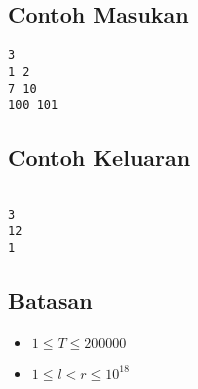 \documentclass{article}
\begin{document}
\subsection*{Contoh Masukan}

\begin{lstlisting}
3
1 2
7 10
100 101

\end{lstlisting}

\subsection*{Contoh Keluaran}

\begin{lstlisting}

3
12
1

\end{lstlisting}

\subsection*{Batasan}

\begin{itemize}
	\item $1 \leq T \leq 200000$
	\item $1 \leq l < r \leq 10^{18}$
\end{itemize}
\end{document}
